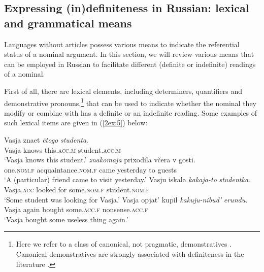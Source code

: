 \documentclass[output=paper]{langsci/langscibook}
\begin{document}
\subsection{Expressing (in)definiteness in Russian: lexical and grammatical means}\label{2sec:21}


Languages without articles possess various means to indicate the referential status of a nominal argument. In this section, we will review various means that can be employed in Russian to facilitate different (definite or indefinite) readings of a nominal. 


First of all, there are lexical elements, including determiners, quantifiers and demonstrative pronouns,\footnote{Here we refer to a class of canonical, not pragmatic, demonstratives \citep[cf.][]{elbourne:08}. Canonical demonstratives are strongly associated with definiteness in the literature \citep[see, for instance,][]{lyons:99,wolter:04,elbourne:08}.} that can be used to indicate whether the nominal they modify or combine with has a definite or an indefinite reading. Some examples of such lexical items are given in (\ref{2ex:5}) below:

\begin{exe}
\ex\label{2ex:5}
	\begin{xlista}
	\ex\label{2ex:5a}
	\gll	Vasja 	znaet 	{\emph{ėtogo}} 		{\emph{studenta}}. \\
		Vasja 	knows 	this.{\textsc{acc.m}} 	student.{\textsc{acc.m}} \\
	\glt	`Vasja knows this student.'
	\ex\label{2ex:5b}
	 		{\emph{znakomaja}}			prixodila 	v\v{c}era 	v 	gosti. \\
		one.{\textsc{nom.f}}	acquaintance.{\textsc{nom.f}} 	came 	yesterday 	to 	guests \\
	\glt	`A (particular) friend came to visit yesterday.'
	\ex\label{2ex:5c}
	\gll	Vasju 			iskala 		{\emph{kakaja-to}} 		{\emph{studentka}}. \\
		Vasja.{\textsc{acc}} 	looked.for 		some.{\textsc{nom.f}} 	student.{\textsc{nom.f}} \\
	\glt	`Some student was looking for Vasja.'
	\ex\label{2ex:5d}
	\gll 	Vasja opjat' 	kupil 		{\emph{kakuju-nibud'}}	{\emph{erundu}}. \\
		Vasja again 	bought 	some.{\textsc{acc.f}} 		nonsense.{\textsc{acc.f}} \\
	\glt	`Vasja bought some useless thing again.'
	\end{xlista}
\end{exe}
\end{document}
